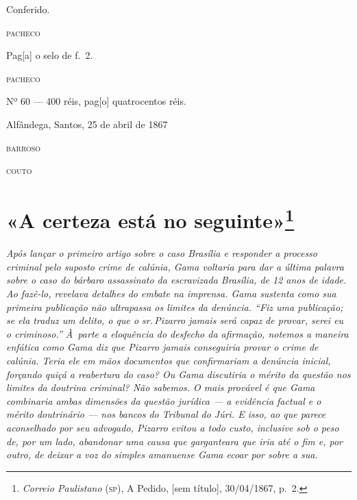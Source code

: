 \begin{flushright}
Conferido.

\textsc{pacheco}
\end{flushright}

\begin{flushright}
Pag{[}a{]} o selo de f.~2.

\textsc{pacheco}
\end{flushright}

\begin{flushright}
Nº 60 --- 400 réis, pag{[}o{]} quatrocentos réis.

Alfândega, Santos, 25 de abril de 1867

\textsc{barroso}

\textsc{couto}
\end{flushright}

\chapter{«A certeza está no seguinte»\footnote{
  \emph{Correio Paulistano} (\textsc{sp}), A Pedido,
  {[}sem título{]}, 30/04/1867, p.~2.}}

\begin{didascalia}\itshape
Após lançar o primeiro artigo sobre o caso Brasília e responder a
processo criminal pelo suposto crime de calúnia, Gama voltaria para dar
a última palavra sobre o caso do bárbaro assassinato da escravizada
Brasília, de 12 anos de idade. Ao fazê-lo, revelava detalhes do
embate na imprensa. Gama sustenta como sua primeira publicação não
ultrapassa os limites da denúncia. ``Fiz uma publicação; se ela traduz um
delito, o que o sr.\,Pizarro jamais será capaz de provar, serei eu o
criminoso.'' À~parte a eloquência do desfecho da afirmação, notemos a
maneira enfática como Gama diz que Pizarro jamais conseguiria provar o
crime de calúnia. Teria ele em mãos documentos que confirmariam a
denúncia inicial, forçando quiçá a reabertura do caso? Ou Gama
discutiria o mérito da questão nos limites da doutrina criminal? Não
sabemos. O mais provável é que Gama combinaria ambas dimensões da
questão jurídica --- a evidência factual e o mérito doutrinário --- nos
bancos do Tribunal do Júri. E isso, ao que parece aconselhado por seu
advogado, Pizarro evitou a todo custo, inclusive sob o peso de, por um
lado, abandonar uma causa que garganteara que iria até o fim e, por
outro, de deixar a voz do simples amanuense Gama ecoar por sobre a sua.
\end{didascalia}




